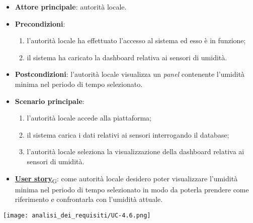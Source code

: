 \begin{itemize}
	\item \textbf{Attore principale}: autorità locale.
	\item \textbf{Precondizioni}:
	      \begin{enumerate}
		      \item l'autorità locale ha effettuato l'accesso al sistema ed esso è in funzione;
		      \item il sistema ha caricato la dashboard relativa ai sensori di umidità.
	      \end{enumerate}
	\item \textbf{Postcondizioni}: l'autorità locale visualizza un \textit{panel} contenente l'umidità minima nel periodo di tempo selezionato.
	\item \textbf{Scenario principale}:
	      \begin{enumerate}
		      \item l'autorità locale accede alla piattaforma;
		      \item il sistema carica i dati relativi ai sensori interrogando il database;
		      \item l'autorità locale seleziona la visualizzazione della dashboard relativa ai sensori di umidità.
	      \end{enumerate}
	\item \href{https://7last.github.io/docs/rtb/documentazione-interna/glossario\#user-story}{\textbf{User story}\textsubscript{G}}:
	      come autorità locale desidero poter visualizzare l'umidità minima nel periodo di tempo selezionato
	      in modo da poterla prendere come riferimento e confrontarla con l'umidità attuale.
\end{itemize}
\begin{center}
	\texttt{[image: analisi\_dei\_requisiti/UC-4.6.png]}
\end{center}

